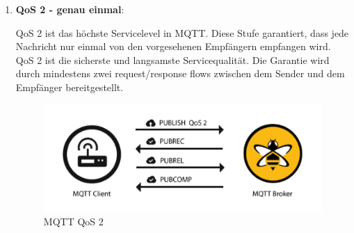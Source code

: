 \begin{enumerate}
    \item \textbf{QoS 2 - genau einmal}:
    
    QoS 2 ist das höchste Servicelevel in MQTT. Diese Stufe garantiert, dass jede Nachricht nur einmal von den vorgesehenen Empfängern empfangen wird. QoS 2 ist die sicherste und langsamste Servicequalität. Die Garantie wird durch mindestens zwei request/response flows zwischen dem Sender und dem Empfänger bereitgestellt. 

    \begin{figure}[H]
        \begin{center}
            \includegraphics[scale=0.8]{images/QoS-2.png}
            \caption{MQTT QoS 2 \cite{hivemq}}
        \end{center}
    \end{figure}
\end{enumerate}






